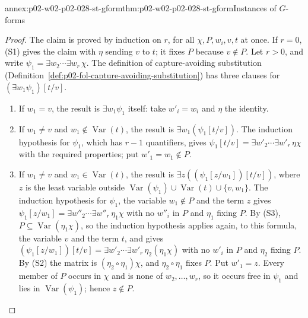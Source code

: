 \begin{annexitem}{annex:p02-w02-p02-028-st-gform}{thm:p02-w02-p02-028-st-gform}{Instances of \(G\)-forms}
\begin{proof}
The claim is proved by induction on \(r\), for all \(\chi,P,w_i,v,t\) at once.
If \(r=0\), (S1) gives the claim with \(\eta\) sending \(v\) to \(t\); it
fixes \(P\) because \(v\notin P\).  Let \(r>0\), and write
\(\psi_1=\exists w_2\cdots\exists w_r\,\chi\).  The definition of
capture-avoiding substitution
(Definition~\ref{def:p02-fol-capture-avoiding-substitution}) has three
clauses for \((\exists w_1\psi_1)[t/v]\).
\begin{enumerate}
  \item If \(w_1=v\), the result is \(\exists w_1\psi_1\) itself: take
        \(w'_i=w_i\) and \(\eta\) the identity.
  \item If \(w_1\neq v\) and \(w_1\notin\operatorname{Var}(t)\), the result
        is \(\exists w_1(\psi_1[t/v])\).  The induction hypothesis for
        \(\psi_1\), which has \(r-1\) quantifiers, gives
        \(\psi_1[t/v]=\exists w'_2\cdots\exists w'_r\,\eta\chi\) with the
        required properties; put \(w'_1=w_1\notin P\).
  \item If \(w_1\neq v\) and \(w_1\in\operatorname{Var}(t)\), the result is
        \(\exists z((\psi_1[z/w_1])[t/v])\), where \(z\) is the least
        variable outside
        \(\operatorname{Var}(\psi_1)\cup\operatorname{Var}(t)\cup\{v,w_1\}\).
        The induction hypothesis for \(\psi_1\), the variable \(w_1\notin P\)
        and the term \(z\) gives
        \(\psi_1[z/w_1]=\exists w''_2\cdots\exists w''_r\,\eta_1\chi\) with no
        \(w''_i\) in \(P\) and \(\eta_1\) fixing \(P\).  By (S3),
        \(P\subseteq\operatorname{Var}(\eta_1\chi)\), so the induction
        hypothesis applies again, to this formula, the variable \(v\) and the
        term \(t\), and gives
        \((\psi_1[z/w_1])[t/v]=\exists w'_2\cdots\exists w'_r\,\eta_2(\eta_1\chi)\)
        with no \(w'_i\) in \(P\) and \(\eta_2\) fixing \(P\).  By (S2) the
        matrix is \((\eta_2\circ\eta_1)\chi\), and \(\eta_2\circ\eta_1\)
        fixes \(P\).  Put \(w'_1=z\).  Every member of \(P\) occurs in
        \(\chi\) and is none of \(w_2,\ldots,w_r\), so it occurs free in
        \(\psi_1\) and lies in \(\operatorname{Var}(\psi_1)\); hence
        \(z\notin P\).
\end{enumerate}


\end{proof}
\end{annexitem}
